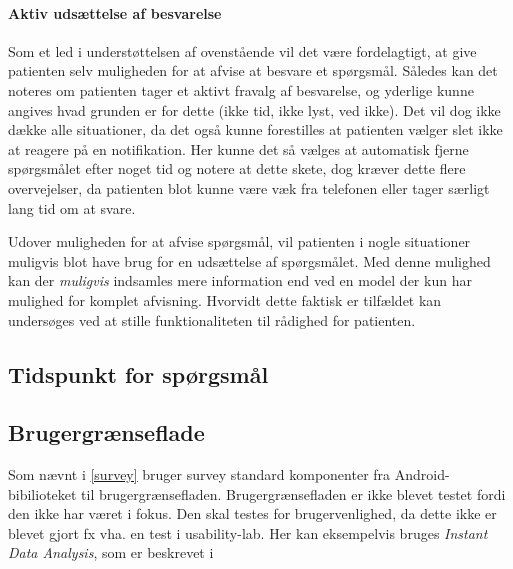 \paragraph{Aktiv udsættelse af besvarelse}
Som et led i understøttelsen af ovenstående vil det være fordelagtigt, at give patienten selv muligheden for at afvise at besvare et spørgsmål.
Således kan det noteres om patienten tager et aktivt fravalg af besvarelse, og yderlige kunne angives hvad grunden er for dette (ikke tid, ikke lyst, ved ikke).
Det vil dog ikke dække alle situationer, da det også kunne forestilles at patienten vælger slet ikke at reagere på en notifikation.
Her kunne det så vælges at automatisk fjerne spørgsmålet efter noget tid og notere at dette skete, dog kræver dette flere overvejelser, da patienten blot kunne være væk fra telefonen eller tager særligt lang tid om at svare.

Udover muligheden for at afvise spørgsmål, vil patienten i nogle situationer muligvis blot have brug for en udsættelse af spørgsmålet.
Med denne mulighed kan der \textit{muligvis} indsamles mere information end ved en model der kun har mulighed for komplet afvisning.
Hvorvidt dette faktisk er tilfældet kan undersøges ved at stille funktionaliteten til rådighed for patienten.

\subsection{Tidspunkt for spørgsmål}\label{refleksion:tidspunkt}

\subsection{Brugergrænseflade}
Som nævnt i \cref{survey} bruger survey standard komponenter fra Android-bibilioteket til brugergrænsefladen.
Brugergrænsefladen er ikke blevet testet fordi den ikke har været i fokus.
Den skal testes for brugervenlighed, da dette ikke er blevet gjort fx vha. en test i usability-lab.
Her kan eksempelvis bruges \emph{Instant Data Analysis}, som er beskrevet i \citet{IDA}


